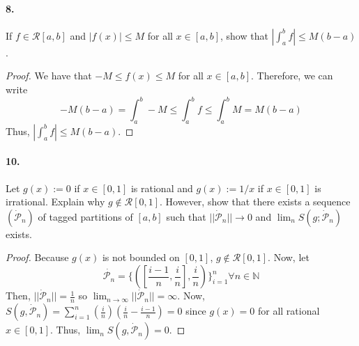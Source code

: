 \documentclass[12pt]{article}
\theoremstyle{remark}
\begin{document}
\paragraph{8.} If $f \in \mathcal{R}[a, b]$ and $|f(x)| \leq M$ for all $x \in[a, b]$, show that $\left|\int_a^b f\right| \leq M(b-a)$.
\begin{proof}
    We have that $-M \leq f(x) \leq M$ for all $x \in[a, b]$. Therefore, we can write $$-M(b - a) = \int_a^b -M \leq \int_a^b f \leq \int_a^b M = M(b - a)$$ Thus, $\left|\int_a^b f\right| \leq M(b - a)$.
\end{proof}

\paragraph{10.} Let $g(x):=0$ if $x \in[0,1]$ is rational and $g(x):=1 / x$ if $x \in[0,1]$ is irrational. Explain why $g \notin \mathcal{R}[0,1]$. However, show that there exists a sequence $(\dot{\mathcal{P}}_n)$ of tagged partitions of $[a, b]$ such that $||\dot{\mathcal{P}}_n|| \rightarrow 0$ and $\lim_n S(g ; \dot{\mathcal{P}}_n)$ exists.
\begin{proof}
    Because $g(x)$ is not bounded on $[0, 1]$, $g \notin \mathcal{R}[0, 1]$. Now, let $$\dot{\mathcal{P}_n} = \{([\frac{i - 1}{n}, \frac{i}{n}], \frac{i}{n})\}_{i = 1}^n \forall n \in \mathbb{N}$$ Then, $||\dot{\mathcal{P}}_n|| = \frac{1}{n}$ so $\lim_{n \to \infty} ||\dot{\mathcal{P}}_n|| = \infty$. Now, $S(g, \dot{\mathcal{P}}_n) = \sum_{i = 1}^n \left(\frac{i}{n}\right) \left(\frac{i}{n} - \frac{i - 1}{n}\right) = 0$ since $g(x) = 0$ for all rational $x \in[0, 1]$. Thus, $\lim_n S(g, \dot{\mathcal{P}}_n) = 0$.
\end{proof}
\end{document}
